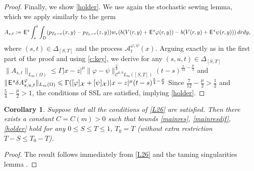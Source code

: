 \documentclass[12pt]{article}
\newtheorem{corollary}[theorem]{Corollary}
\theoremstyle{definition}
\DeclareMathOperator{\1}{\mathbbm{1}}%
\def\E{\hskip.15ex\mathsf{E}\hskip.10ex}
\def\phi{\varphi}
\renewcommand{\le}{\leqslant}
\newcommand{\A}{\mathcal{A}}
\newcommand{\C}{\mathcal{C}}
\newcommand{\X}{\mathcal{X}}
\begin{document}
\begin{proof}
Finally, we show \eqref{holder}. We use again the stochastic sewing lemma, which we apply similarly to the germ 
\begin{equation*}
A_{s,t}:=\E^s\int_s^t \int_D( p_{T_0-r}(x,y)-p_{T_0-r}(z,y))w_r (b( V(r,y)+\E^s \phi(r,y))-b( V(r,y)+\E^s\psi(r,y)))\,dr dy, 
\end{equation*}
where $(s,t)\in\Delta_{[S,T]}$
and the process $\A^{\phi,\psi}_{t}(x)$.
Arguing exactly as in the first part of the proof and using \cref{c:key}, we derive for any $(s,u,t)\in\Delta_{[S,T]}$ 
$\|A_{s,t}\|_{L_m(\Omega)}\le  \Gamma |x-z|^\mu
\|\phi-\psi\|^{\frac23}_{\C^{0,0}L_m([S,T])}(t-s)^{\frac7{12}-\frac\mu2}$
and $
\|\E^s\delta A^\phi_{s,u,t}\|_{L_m(\Omega)}\le  \Gamma([\phi]_{\X}+[\psi]_{\X})|x-z|^\mu (t-s)^{\frac54-\frac\mu2}
$%
Since $\frac7{12}-\frac\mu2>\frac12$ and $\frac54-\frac\mu2>1$, the conditions of SSL are satisfied, implying \eqref{holder}. 
\end{proof}

\begin{corollary}\label{c:39}
Suppose that all the conditions of \cref{L26} are satisfied. Then there exists a constant $C=C(m)>0$ such that bounds \eqref{mainres}, \eqref{mainresdif}, \eqref{holder} hold for any $0\le S\le T\le 1$, $T_0=T$ (without extra restriction $T-S\le T_0-T$). 
\end{corollary}
\begin{proof}
The result follows immediately from \cref{L26} and the taming singularities lemma \cite[Lemma~2.3]{BFG}.
\end{proof}
\end{document}
